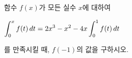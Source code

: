 함수 $f(x)$가 모든 실수 $x$에 대하여 \par\smallskip\noindent\hspace*{1.5em}$\displaystyle\int_{0}^{x}f(t)\mkern3mu dt=2x^3-x^2-4x\int_{0}^{1}f(t)\mkern3mu dt$\par\smallskip\noindent 를 만족시킬 때, $f(-1)$의 값을 구하시오.
